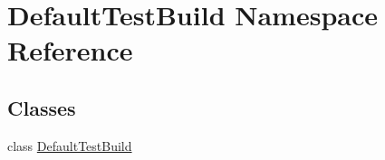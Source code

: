 \hypertarget{namespace_default_test_build}{\section{Default\-Test\-Build Namespace Reference}
\label{namespace_default_test_build}
}
\subsection*{Classes}
\begin{DoxyCompactItemize}
\item 
class \hyperlink{class_default_test_build_1_1_default_test_build}{Default\-Test\-Build}
\end{DoxyCompactItemize}
